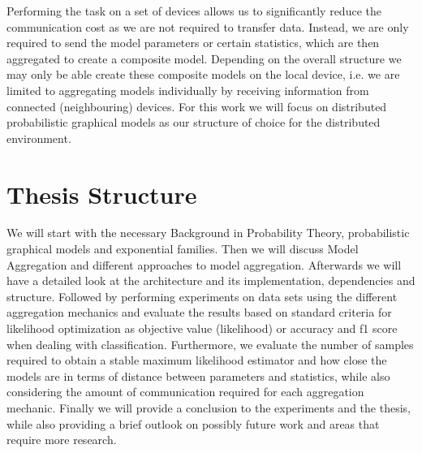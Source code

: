 Performing the task on a set of devices allows us to significantly reduce the communication cost as we are not required to transfer data.
Instead, we are only required to send the model parameters or certain statistics, which are then aggregated to create a composite model.
Depending on the overall structure we may only be able create these composite models on the local device, i.e. we are limited to aggregating models individually by receiving information from connected (neighbouring) devices.
For this work we will focus on distributed probabilistic graphical models as our structure of choice for the distributed environment.
\section{Thesis Structure}

We will start with the necessary Background in Probability Theory, probabilistic graphical models and exponential families.
Then we will discuss Model Aggregation and different approaches to model aggregation. 
Afterwards we will have a detailed look at the architecture and its implementation, dependencies and structure.
Followed by performing experiments on data sets using the different aggregation mechanics and evaluate the results based on standard criteria for likelihood optimization as objective value (likelihood) or accuracy and f1 score when dealing with classification. 
Furthermore, we evaluate the number of samples required to obtain a stable maximum likelihood estimator and how close the models are in terms of distance between parameters and statistics, while also considering the amount of communication required for each aggregation mechanic.
Finally we will provide a conclusion to the experiments and the thesis, while also providing a brief outlook on possibly future work and areas that require more research.
